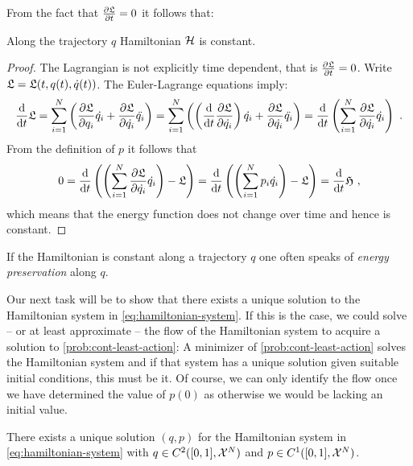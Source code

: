 From the fact that $\frac{\partial \mathfrak{L}}{\partial t} = 0$ it follows that:
\begin{corollary}
	\label{cor:energy-preservation}
	Along the trajectory $q$ Hamiltonian $\mathcal{H}$ is constant.
\end{corollary}
\begin{proof}
	The Lagrangian is not explicitly time dependent, that is $\frac{\partial \mathfrak{L}}{\partial t} = 0$.
	Write $\mathfrak{L} = \mathfrak{L}(t, q(t), \dot{q}(t))$.
	The Euler-Lagrange equations imply:
	\begin{equation}
		\frac{\mathrm{d}}{\mathrm{d} t} \mathfrak{L} = \sum_{i=1}^{N}\left(\frac{\partial \mathfrak{L}}{\partial q_i} \dot{q_i} + \frac{\partial \mathfrak{L}}{\partial \dot{q_i}} \ddot{q_i} \right )
		=\sum_{i=1}^{N}\left( \left( \frac{\mathrm{d}}{\mathrm{d} t} \frac{\partial \mathfrak{L}}{\partial \dot{q_i}} 
		\right)\dot{q_i}+ \frac{\partial \mathfrak{L}}{\partial \dot{q_i}} \ddot{q_i}\right )
		= \frac{\mathrm{d}}{\mathrm{d} t} \left(\sum_{i=1}^{N} \frac{\partial \mathfrak{L}}{\partial \dot{q_i}} \dot{q_i}\right) \ .
	\end{equation}
	From the definition of $p$ it follows that
	\begin{equation}
		0 = \frac{\mathrm{d}}{\mathrm{d} t} \left( \left(\sum_{i=1}^{N} \frac{\partial \mathfrak{L}}{\partial \dot{q_i}} \dot{q_i} \right) -  \mathfrak{L} \right) 
		= \frac{\mathrm{d}}{\mathrm{d} t} \left( \left(\sum_{i=1}^{N} p_i \dot{q_i} \right ) - \mathfrak{L} \right)
		= \frac{\mathrm{d}}{\mathrm{d} t} \mathfrak{H} \ ,
	\end{equation}
	which means that the energy function does not change over time and hence is constant.
\end{proof}
If the Hamiltonian is constant along a trajectory $q$ one often speaks of \emph{energy preservation} along $q$.

Our next task will be to show that there exists a unique solution to the Hamiltonian system in \cref{eq:hamiltonian-system}.
If this is the case, we could solve -- or at least approximate -- the flow of the Hamiltonian system to acquire a solution to \cref{prob:cont-least-action}:
A minimizer of \cref{prob:cont-least-action} solves the Hamiltonian system and if that system has a unique solution given suitable initial conditions, this must be it.
Of course, we can only identify the flow once we have determined the value of $p(0)$ as otherwise we would be lacking an initial value.

\begin{theorem}
	There exists a unique solution $(q, p)$ for the Hamiltonian system in \cref{eq:hamiltonian-system} with $q \in C^2([0, 1], \mathcal{X}^N)$ and $p \in C^1([0, 1], \mathcal{X}^N)$.
\end{theorem}

